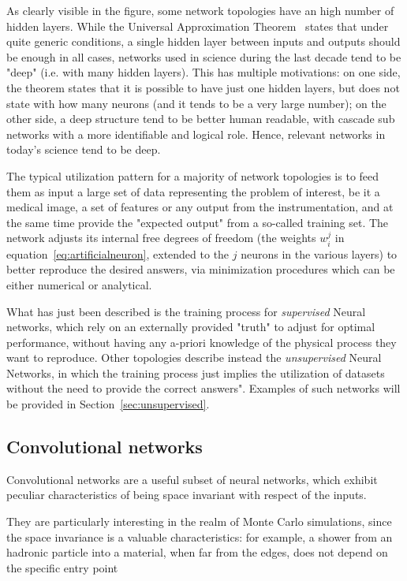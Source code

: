 As clearly visible in the figure, some network topologies have an high number of hidden layers. While the Universal Approximation Theorem~\cite{nonlinearitytheorem} states that under quite generic conditions, a single hidden layer between inputs and outputs should be enough in all cases, networks used in science during the last decade tend to be "deep" (i.e. with many hidden layers). This has multiple motivations: on one side, the theorem states that it is possible to have just one hidden layers, but does not state with how many neurons (and it tends to be a very large number); on the other side, a deep structure tend to be better human readable, with cascade sub networks with a more identifiable and logical role. Hence, relevant networks in today's science tend to be deep.

The typical utilization pattern for a majority of network topologies is to feed them as input a large set of data representing the problem of interest, be it a medical image, a set of features or any output from the instrumentation, and at the same time provide the "expected output" from a so-called training set. The network adjusts its internal free degrees of freedom (the weights $w_i^j$ in equation~\ref{eq:artificialneuron}, extended to the $j$ neurons in the various layers) to better reproduce the desired answers, via minimization procedures which can be either numerical or analytical.

What has just been described is the training process for \emph{supervised} Neural networks, which rely on an externally provided "truth" to adjust for optimal performance, without having any a-priori knowledge of the physical process they want to reproduce.
Other topologies describe instead the \emph{unsupervised} Neural Networks, in which the training process just implies the utilization of datasets without the need to provide the correct answers". Examples of such networks will be provided in Section~\ref{sec:unsupervised}.


\subsection{Convolutional networks}
Convolutional networks are a useful subset of neural networks, which exhibit peculiar characteristics of being space invariant with respect of the inputs.

They are particularly interesting in the realm of Monte Carlo simulations, since the space invariance is a valuable characteristics: for example, a shower from an hadronic particle into a material, when far from the edges, does not depend on the specific entry point

